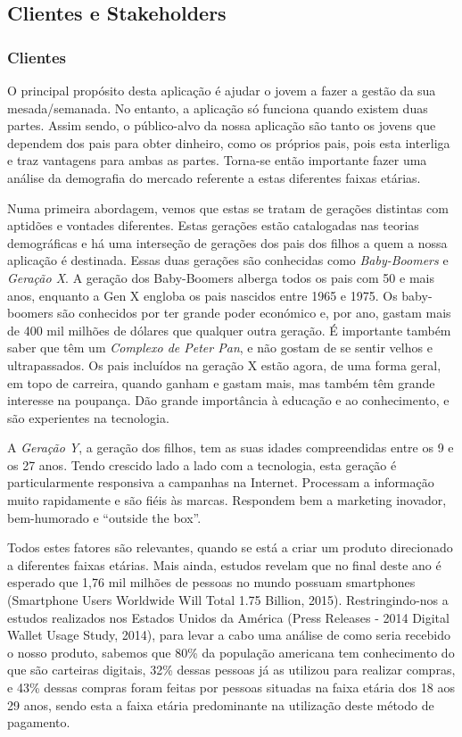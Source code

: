 \documentclass[12pt,a4paper]{article}
\begin{document}
  \subsection{Clientes e Stakeholders}
    \subsubsection{Clientes}
      O principal propósito desta aplicação é ajudar o jovem a fazer a gestão da sua mesada/semanada. No entanto, a aplicação só funciona quando existem duas partes. Assim sendo, o público-alvo da nossa aplicação são tanto os jovens que dependem dos pais para obter dinheiro, como os próprios pais, pois esta interliga e traz vantagens para ambas as partes. Torna-se então importante fazer uma análise da demografia do mercado referente a estas diferentes faixas etárias.

      Numa primeira abordagem, vemos que estas se tratam de gerações distintas com aptidões e vontades diferentes. Estas gerações estão catalogadas nas teorias demográficas e há uma interseção de gerações dos pais dos filhos a quem a nossa aplicação é destinada. Essas duas gerações são conhecidas como \emph{Baby-Boomers} e \emph{Geração X}. A geração dos Baby-Boomers alberga todos os pais com 50 e mais anos, enquanto a Gen X engloba os pais nascidos entre 1965 e 1975. Os baby-boomers são conhecidos por ter grande poder económico e, por ano, gastam mais de 400 mil milhões de dólares que qualquer outra geração. É importante também saber que têm um \emph{Complexo de Peter Pan}, e não gostam de se sentir velhos e ultrapassados. Os pais incluídos na geração X estão agora, de uma forma geral, em topo de carreira, quando ganham e gastam mais, mas também têm grande interesse na poupança. Dão grande importância à educação e ao conhecimento, e são experientes na tecnologia.

      A \emph{Geração Y}, a geração dos filhos, tem as suas idades compreendidas entre os 9 e os 27 anos. Tendo crescido lado a lado com a tecnologia, esta geração é particularmente responsiva a campanhas na Internet. Processam a informação muito rapidamente e são fiéis às marcas. Respondem bem a marketing inovador, bem-humorado e ``outside the box''.

      Todos estes fatores são relevantes, quando se está a criar um produto direcionado a diferentes faixas etárias. Mais ainda, estudos revelam que no final deste ano é esperado que 1,76 mil milhões de pessoas no mundo possuam smartphones (Smartphone Users Worldwide Will Total 1.75 Billion, 2015). Restringindo-nos a estudos realizados nos Estados Unidos da América (Press Releases - 2014 Digital Wallet Usage Study, 2014), para levar a cabo uma análise de como seria recebido o nosso produto, sabemos que 80\% da população americana tem conhecimento do que são carteiras digitais, 32\% dessas pessoas já as utilizou para realizar compras, e 43\% dessas compras foram feitas por pessoas situadas na faixa etária dos 18 aos 29 anos, sendo esta a faixa etária predominante na utilização deste método de pagamento.
\end{document}
